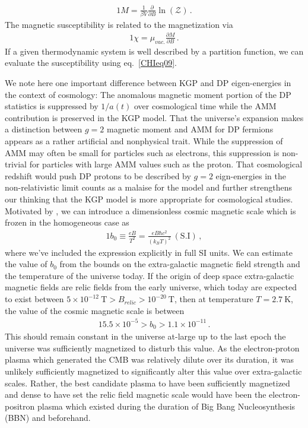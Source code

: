 \begin{alignat}{1}
  \label{Mag} M=\frac{1}{\beta V}\frac{\partial}{\partial B}\ln\left(\mathcal{Z}\right)\,.
\end{alignat}
The magnetic susceptibility is related to the magnetization via
\begin{alignat}{1}
  \label{CHIeq09} \chi=\mu_{vac.}\frac{\partial M}{\partial B}\,.
\end{alignat}
If a given thermodynamic system is well described by a partition function, we can evaluate the susceptibility using eq.~\eqref{CHIeq09}.








We note here one important difference between KGP and DP eigen-energies in the context of cosmology: The anomalous magnetic moment portion of the DP statistics is suppressed by $1/a(t)$ over cosmological time while the AMM contribution is preserved in the KGP model. That the universe's expansion makes a distinction between $g=2$ magnetic moment and AMM for DP fermions appears as a rather artificial and nonphysical trait. While the suppression of AMM may often be small for particles such as electrons, this suppression is non-trivial for particles with large AMM values such as the proton. That cosmological redshift would push DP protons to be described by $g=2$ eign-energies in the non-relativistic limit counts as a malaise for the model and further strengthens our thinking that the KGP model is more appropriate for cosmological studies. Motivated by , we can introduce a dimensionless cosmic magnetic scale which is frozen in the homogeneous case as
\begin{alignat}{1}
    \label{Bo} b_{0}\equiv\frac{eB}{T^{2}}=\frac{eB\hbar c^{2}}{(k_{B}T)^{2}}\ \mathrm{(S.I)}\,,
\end{alignat}
where we've included the expression explicitly in full SI units. We can estimate the value of $b_{0}$ from the bounds on the extra-galactic magnetic field strength and the temperature of the universe today.  If the origin of deep space extra-galactic magnetic fields are relic fields from the early universe, which today are expected to exist between $5\times10^{-12}\ \mathrm{T}>B_{relic}>10^{-20}\ \mathrm{T}$, then at temperature $T=2.7\ \mathrm{K}$, the value of the cosmic magnetic scale is between
\begin{alignat}{1}
    \label{BoScale} 5.5\times10^{-5}>b_{0}>1.1\times10^{-11}\,.
\end{alignat}
This should remain constant in the universe at-large up to the last epoch the universe was sufficiently magnetized to disturb this value. As the electron-proton plasma which generated the CMB was relatively dilute over its duration, it was unlikely sufficiently magnetized to significantly alter this value over extra-galactic scales. Rather, the best candidate plasma to have been sufficiently magnetized and dense to have set the relic field magnetic scale would have been the electron-positron plasma which existed during the duration of Big Bang Nucleosynthesis (BBN) and beforehand.

